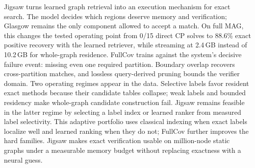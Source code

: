 \documentclass{article}
\begin{document}
Jigsaw turns learned graph retrieval into an execution mechanism for exact search. The model decides which regions deserve memory and verification; Glasgow remains the only component allowed to accept a match. On full MAG, this changes the tested operating point from 0/15 direct CP solves to 88.6\% exact positive recovery with the learned retriever, while streaming at 2.4\,GB instead of 10.2\,GB for whole-graph residence. FullCov trains against the system's decisive failure event: missing even one required partition. Boundary overlap recovers cross-partition matches, and lossless query-derived pruning bounds the verifier domain. Two operating regimes appear in the data. Selective labels favor resident exact methods because their candidate tables collapse; weak labels and bounded residency make whole-graph candidate construction fail. Jigsaw remains feasible in the latter regime by selecting a label index or learned ranker from measured label selectivity. This adaptive portfolio uses classical indexing when exact labels localize well and learned ranking when they do not; FullCov further improves the hard families. Jigsaw makes exact verification usable on million-node static graphs under a measurable memory budget without replacing exactness with a neural guess.

\end{document}
